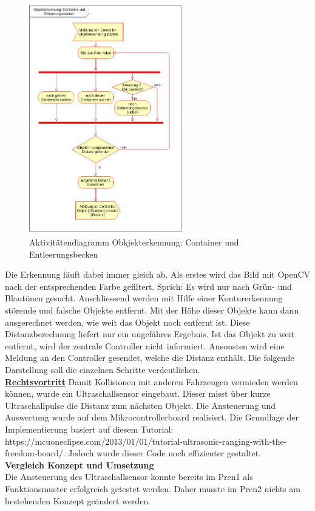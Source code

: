 \begin{figure}[H]%
\centering
\includegraphics[width=0.6\textwidth]{03_Loesungskonzept/pictures/objekterkennung_containers.png}
\caption{Aktivitätendiagramm Obkjekterkennung: Container und Entleerungsbecken}
\label{fig:activityContainer}
\end{figure}
\newpage
Die Erkennung läuft dabei immer gleich ab. Als erstes wird das Bild mit OpenCV nach der entsprechenden Farbe gefiltert. Sprich: Es wird nur nach Grün- und Blautönen gesucht. Anschliessend werden mit Hilfe einer Konturerkennung störende und falsche Objekte entfernt. Mit der Höhe dieser Objekte kann dann ausgerechnet werden, wie weit das Objekt  noch entfernt ist. Diese Distanzberechnung liefert nur ein ungefähres Ergebnis. Ist das Objekt zu weit entfernt, wird der zentrale Controller nicht informiert. Ansonsten wird eine Meldung an den Controller gesendet, welche die Distanz enthält. Die folgende Darstellung soll die einzelnen Schritte verdeutlichen.
\\[0.2cm]


\underline{\textbf{Rechtsvortritt}}
Damit Kollisionen mit anderen Fahrzeugen vermieden werden können, wurde ein Ultraschallsensor eingebaut. Dieser misst über kurze Ultraschallpulse die Distanz zum nächsten Objekt. Die Ansteuerung und Auswertung wurde auf dem Mikrocontrollerboard realisiert. Die Grundlage der Implementierung basiert auf diesem Tutorial: https://mcuoneclipse.com/2013/01/01/tutorial-ultrasonic-ranging-with-the-freedom-board/. Jedoch wurde dieser Code noch effizienter gestaltet.\\[0.2cm]
\textbf{Vergleich Konzept und Umsetzung}\\[0.2cm]
Die Ansteuerung des Ultraschallsensor konnte bereits im Pren1 als Funktionsmuster erfolgreich getestet werden. Daher musste im Pren2 nichts am bestehenden Konzept geändert werden.


